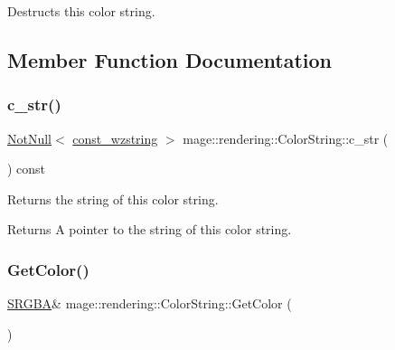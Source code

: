 Destructs this color string. 

\subsection{Member Function Documentation}
\hypertarget{classmage_1_1rendering_1_1_color_string_a2706724097d2ad5c187d34db49d86bda}{}\label{classmage_1_1rendering_1_1_color_string_a2706724097d2ad5c187d34db49d86bda} 
\subsubsection{\texorpdfstring{c\+\_\+str()}{c\_str()}}
{\footnotesize\ttfamily \hyperlink{namespacemage_a8769f9d670d6b585ea306cb1062af94b}{Not\+Null}$<$ \hyperlink{namespacemage_ac409e0f2a22292a3a4cd42742994fbf0}{const\+\_\+wzstring} $>$ mage\+::rendering\+::\+Color\+String\+::c\+\_\+str (\begin{DoxyParamCaption}{ }\end{DoxyParamCaption}) const\hspace{0.3cm}{\ttfamily [noexcept]}}

Returns the string of this color string.

\begin{DoxyReturn}{Returns}
A pointer to the string of this color string. 
\end{DoxyReturn}
\hypertarget{classmage_1_1rendering_1_1_color_string_a565834879d191509832660f39a923df3}{}\label{classmage_1_1rendering_1_1_color_string_a565834879d191509832660f39a923df3} 
\subsubsection{\texorpdfstring{Get\+Color()}{GetColor()}\hspace{0.1cm}{\footnotesize\ttfamily [1/2]}}
{\footnotesize\ttfamily \hyperlink{structmage_1_1_s_r_g_b_a}{S\+R\+G\+BA}\& mage\+::rendering\+::\+Color\+String\+::\+Get\+Color (\begin{DoxyParamCaption}{ }\end{DoxyParamCaption})\hspace{0.3cm}{\ttfamily [noexcept]}}


